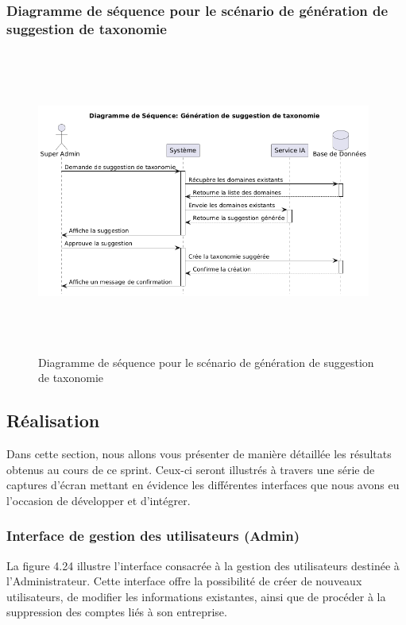 \subsubsection{Diagramme de séquence pour le scénario de génération de suggestion de taxonomie}
\begin{figure}[H]
    \centering
    \includegraphics[width=11cm,height=10cm]{images/taxonomyaisq.png}
    \caption{Diagramme de séquence pour le scénario de génération de suggestion de taxonomie}
\end{figure}

\subsection{Réalisation}
\noindent Dans cette section, nous allons vous présenter de manière détaillée les résultats obtenus au cours de ce sprint. Ceux-ci seront illustrés à travers une série de captures d’écran mettant en évidence les différentes interfaces que nous avons eu l’occasion de développer et d’intégrer.

\subsubsection{Interface de gestion des utilisateurs (Admin)}
\noindent La figure 4.24 illustre l’interface consacrée à la gestion des utilisateurs destinée à l’Administrateur. Cette interface offre la possibilité de créer de nouveaux utilisateurs, de modifier les informations existantes, ainsi que de procéder à la suppression des comptes liés à son entreprise.

